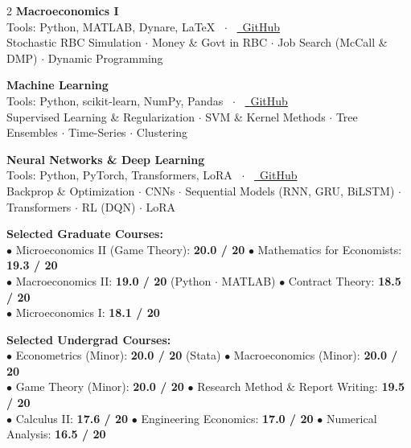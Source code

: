 \documentclass[10pt,a4paper]{article}
\newcommand{\scorebadge}[1]{%
  \tcbox[on line, colback=chipbg, colframe=chipborder, arc=2pt, boxrule=0.45pt, boxsep=0pt, left=3.5pt, right=3.5pt, top=1.2pt, bottom=1.2pt]{%
    \scriptsize\bfseries\color{slate800}#1%
  }%
}
\begin{document}
\begin{paracol}{2}
\vspace{2.5pt}
\noindent
\textbf{Macroeconomics I} \hfill \scorebadge{19.0 / 20}\\
{\scriptsize\color{muted} Tools: Python, MATLAB, Dynare, LaTeX \ $\cdot$ \ \href{https://github.com/AmirrezaFarnamTaheri/Macroeconomics-I}{\color{accent}\faExternalLink*\ GitHub}}\\
{\scriptsize Stochastic RBC Simulation $\cdot$ Money \& Govt in RBC $\cdot$ Job Search (McCall \& DMP) $\cdot$ Dynamic Programming}

\vspace{2.5pt}
\noindent
\textbf{Machine Learning} \hfill \scorebadge{18.5 / 20}\\
{\scriptsize\color{muted} Tools: Python, scikit-learn, NumPy, Pandas \ $\cdot$ \ \href{https://github.com/AmirrezaFarnamTaheri/Machine-Learning}{\color{accent}\faExternalLink*\ GitHub}}\\
{\scriptsize Supervised Learning \& Regularization $\cdot$ SVM \& Kernel Methods $\cdot$ Tree Ensembles $\cdot$ Time-Series $\cdot$ Clustering}

\vspace{2.5pt}
\noindent
\textbf{Neural Networks \& Deep Learning} \hfill \scorebadge{17.0 / 20}\\
{\scriptsize\color{muted} Tools: Python, PyTorch, Transformers, LoRA \ $\cdot$ \ \href{https://github.com/AmirrezaFarnamTaheri/Deep-Learning-2025}{\color{accent}\faExternalLink*\ GitHub}}\\
{\scriptsize Backprop \& Optimization $\cdot$ CNNs $\cdot$ Sequential Models (RNN, GRU, BiLSTM) $\cdot$ Transformers $\cdot$ RL (DQN) $\cdot$ LoRA}

\vspace{2.5pt}
\noindent
\textbf{Selected Graduate Courses:}\\
{\scriptsize
$\bullet$ Microeconomics II (Game Theory): \textbf{20.0 / 20} \quad
$\bullet$ Mathematics for Economists: \textbf{19.3 / 20}\\
$\bullet$ Macroeconomics II: \textbf{19.0 / 20} (Python $\cdot$ MATLAB) \quad
$\bullet$ Contract Theory: \textbf{18.5 / 20}\\
$\bullet$ Microeconomics I: \textbf{18.1 / 20}
}

\vspace{2.5pt}
\noindent
\textbf{Selected Undergrad Courses:}\\
{\scriptsize
$\bullet$ Econometrics (Minor): \textbf{20.0 / 20} (Stata) \quad
$\bullet$ Macroeconomics (Minor): \textbf{20.0 / 20}\\
$\bullet$ Game Theory (Minor): \textbf{20.0 / 20} \quad
$\bullet$ Research Method \& Report Writing: \textbf{19.5 / 20}\\
$\bullet$ Calculus II: \textbf{17.6 / 20} \quad
$\bullet$ Engineering Economics: \textbf{17.0 / 20} \quad
$\bullet$ Numerical Analysis: \textbf{16.5 / 20}
}


\end{paracol}
\end{document}
